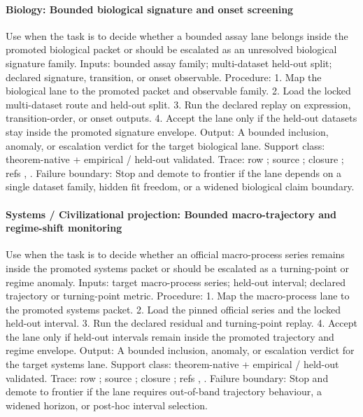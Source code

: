 \paragraph{Biology: Bounded biological signature and onset screening}
Use when the task is to decide whether a bounded assay lane belongs inside the promoted biological packet or should be escalated as an unresolved biological signature family.
Inputs: bounded assay family; \allowbreak multi-dataset held-out split; \allowbreak declared signature, transition, or onset observable.
Procedure: 1. Map the biological lane to the promoted packet and observable family. 2. Load the locked multi-dataset route and held-out split. 3. Run the declared replay on expression, transition-order, or onset outputs. 4. Accept the lane only if the held-out datasets stay inside the promoted signature envelope.
Output: A bounded inclusion, anomaly, or escalation verdict for the target biological lane.
Support class: theorem-native + empirical / held-out validated.
Trace: row ; \allowbreak source ; \allowbreak closure ; \allowbreak refs , \allowbreak {}.
Failure boundary: Stop and demote to frontier if the lane depends on a single dataset family, hidden fit freedom, or a widened biological claim boundary.

\paragraph{Systems / Civilizational projection: Bounded macro-trajectory and regime-shift monitoring}
Use when the task is to decide whether an official macro-process series remains inside the promoted systems packet or should be escalated as a turning-point or regime anomaly.
Inputs: target macro-process series; \allowbreak held-out interval; \allowbreak declared trajectory or turning-point metric.
Procedure: 1. Map the macro-process lane to the promoted systems packet. 2. Load the pinned official series and the locked held-out interval. 3. Run the declared residual and turning-point replay. 4. Accept the lane only if held-out intervals remain inside the promoted trajectory and regime envelope.
Output: A bounded inclusion, anomaly, or escalation verdict for the target systems lane.
Support class: theorem-native + empirical / held-out validated.
Trace: row ; \allowbreak source ; \allowbreak closure ; \allowbreak refs , \allowbreak {}.
Failure boundary: Stop and demote to frontier if the lane requires out-of-band trajectory behaviour, a widened horizon, or post-hoc interval selection.

